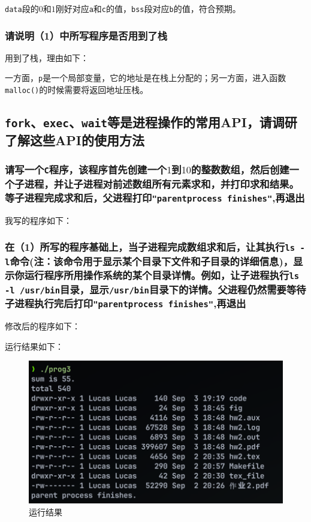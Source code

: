 \noindent
{\tt data}段的$0$和$1$刚好对应{\tt a}和{\tt c}的值，{\tt bss}段对应{\tt b}的值，符合预期。

\subsubsection{
    请说明（1）中所写程序是否用到了栈
}

\noindent
用到了栈，理由如下：

一方面，{\tt p}是一个局部变量，它的地址是在栈上分配的；另一方面，进入函数{\tt malloc()}的时候需要将返回地址压栈。

\subsection{
    {\tt fork}、{\tt exec}、{\tt wait}等是进程操作的常用API，请调研了解这些API的使用方法
}

\subsubsection{
    请写一个{\tt C}程序，该程序首先创建一个$1$到$10$的整数数组，然后创建一个子进程，并让子进程对前述数组所有元素求和，并打印求和结果。等子进程完成求和后，父进程打印{\tt "parentprocess finishes"},再退出
}

\noindent
我写的程序如下：



\subsubsection{
    在（1）所写的程序基础上，当子进程完成数组求和后，让其执行{\tt ls -l}命令(注：该命令用于显示某个目录下文件和子目录的详细信息)，显示你运行程序所用操作系统的某个目录详情。例如，让子进程执行{\tt ls -l /usr/bin}目录，显示{\tt /usr/bin}目录下的详情。父进程仍然需要等待子进程执行完后打印{\tt "parentprocess finishes"},再退出
}

\noindent
修改后的程序如下：



\noindent
运行结果如下：

\begin{figure}[H]
    \centering
    \includegraphics[width=1\textwidth]{fig/ls.png}
    \caption{运行结果}
\end{figure}

